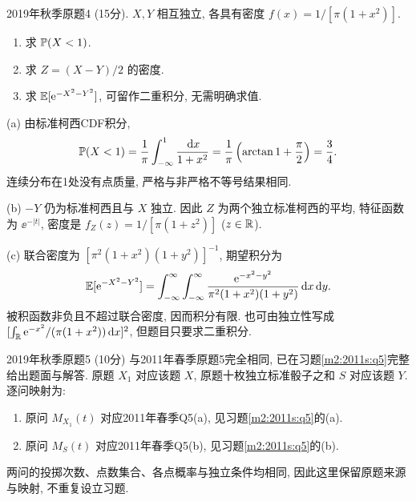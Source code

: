 \begin{exercise}\label{m2:2019f:q4}
2019年秋季原题4 (15分). $X,Y$ 相互独立, 各具有密度 $f(x)=1/[\pi(1+x^2)]$.
\begin{enumerate}
\item[(a)]\label{m2:2019f:q4:a} 求 $\mathbb P(X<1)$.
\item[(b)]\label{m2:2019f:q4:b} 求 $Z=(X-Y)/2$ 的密度.
\item[(c)]\label{m2:2019f:q4:c} 求 $\mathbb E[\mathrm e^{-X^2-Y^2}]$, 可留作二重积分, 无需明确求值.
\end{enumerate}
\end{exercise}
\begin{solution}
(a) 由标准柯西CDF积分,
\[
\mathbb P(X<1)=\frac1\pi\int_{-\infty}^1\frac{\,\mathrm d x}{1+x^2}=\frac1\pi\left(\arctan1+\frac\pi2\right)=\frac34.
\]
连续分布在1处没有点质量, 严格与非严格不等号结果相同.

(b) $-Y$ 仍为标准柯西且与 $X$ 独立. 因此 $Z$ 为两个独立标准柯西的平均, 特征函数为 $\ee^{-|t|}$, 密度是 $f_Z(z)=1/[\pi(1+z^2)]$ ($z\in\mathbb R$).

(c) 联合密度为 $[\pi^2(1+x^2)(1+y^2)]^{-1}$, 期望积分为
\[
\mathbb E[\mathrm e^{-X^2-Y^2}]=\int_{-\infty}^{\infty}\int_{-\infty}^{\infty}\frac{\mathrm e^{-x^2-y^2}}{\pi^2(1+x^2)(1+y^2)}\,\mathrm d x\,\mathrm d y.
\]
被积函数非负且不超过联合密度, 因而积分有限. 也可由独立性写成 $[\int_{\mathbb R}\mathrm e^{-x^2}/(\pi(1+x^2))\,\mathrm d x]^2$, 但题目只要求二重积分.
\end{solution}

\begin{remark}\label{m2:2019f:q5}
2019年秋季原题5 (10分) 与2011年春季原题5完全相同, 已在习题\ref{m2:2011s:q5}完整给出题面与解答. 原题 $X_1$ 对应该题 $X$, 原题十枚独立标准骰子之和 $S$ 对应该题 $Y$. 逐问映射为:
\begin{enumerate}
\item[(a)]\label{m2:2019f:q5:a} 原问 $M_{X_1}(t)$ 对应2011年春季Q5(a), 见习题\ref{m2:2011s:q5}的(a).
\item[(b)]\label{m2:2019f:q5:b} 原问 $M_S(t)$ 对应2011年春季Q5(b), 见习题\ref{m2:2011s:q5}的(b).
\end{enumerate}
两问的投掷次数、点数集合、各点概率与独立条件均相同, 因此这里保留原题来源与映射, 不重复设立习题.
\end{remark}

